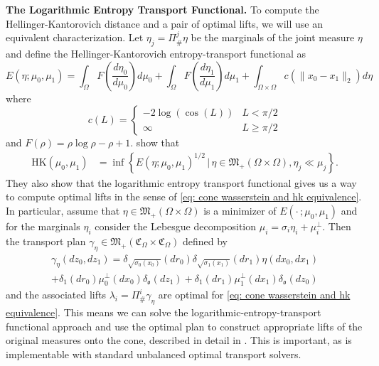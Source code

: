 \documentclass[11pt]{article}
\begin{document}
\noindent \textbf{The Logarithmic Entropy Transport Functional.}
To compute the Hellinger-Kantorovich distance and a pair of optimal lifts, we will use an equivalent characterization. Let $\eta_j = \Pi^j_\#\eta$ be the marginals of the joint measure $\eta$ and define the Hellinger-Kantorovich entropy-transport functional as
\begin{equation} \label{eq: let functional}
    E(\eta; \mu_0, \mu_1) = \int_{\Omega}F\left(\frac{d\eta_0}{d\mu_0}\right)d\mu_0 + \int_{\Omega}F\left(\frac{d\eta_1}{d\mu_1}\right)d\mu_1 + \int_{\Omega \times \Omega}c(\|x_0 - x_1\|_2)d\eta
\end{equation}
where
\begin{equation*}
    c(L) = \begin{cases}
        -2\log(\cos(L)) & L < \pi/2 \\
        \infty & L \geq \pi/2
    \end{cases}
\end{equation*}
and $F(\rho) = \rho\log\rho - \rho + 1.$ \citet{liero2016optimal} show that 
\begin{align} \label{eq: let hk equivalence}
    \text{HK}(\mu_0, \mu_1) &= \inf\left\{E(\eta;\mu_0, \mu_1)^{1/2} \, |\, \eta  \in \mathfrak{M}_+(\Omega \times \Omega), \eta_j  \ll \mu_j\right\}.
\end{align}
They also show that the logarithmic entropy transport functional gives us a way to compute optimal lifts in the sense of \cref{eq: cone wasserstein and hk equivalence}. In particular, assume that $\eta \in \mathfrak{M}_+(\Omega \times \Omega)$ is a minimizer of $E(\cdot\,; \mu_0, \mu_1)$ and for the marginals $\eta_i$ consider the Lebesgue decomposition $\mu_i = \sigma_i\eta_i + \mu_i^\perp$. Then the transport plan $\gamma_{\eta} \in \mathfrak{M}_+(\mathfrak{C}_{\Omega} \times \mathfrak{C}_{\Omega})$ defined by
\begin{multline}\label{eq: optimal lift}
    \gamma_{\eta}(dz_0, dz_1) = \delta_{\sqrt{\sigma_0(x_0)}}(dr_0)\delta_{\sqrt{\sigma_1(x_1)}}(dr_1)\eta(dx_0, dx_1) \\
    + \delta_1(dr_0)\mu_0^\perp(dx_0)\delta_{\mathfrak{o}}(dz_1) + \delta_1(dr_1)\mu_1^\perp(dx_1)\delta_{\mathfrak{o}}(dz_0) 
\end{multline}
and the associated lifts $\lambda_i = \Pi_{\#}^i\gamma_\eta$ are optimal for \cref{eq: cone wasserstein and hk equivalence}. This means we can solve the logarithmic-entropy-transport functional approach and use the optimal plan to construct appropriate lifts of the original measures onto the cone, described in detail in . This is important, as  is implementable with standard unbalanced optimal transport solvers. 
\end{document}
